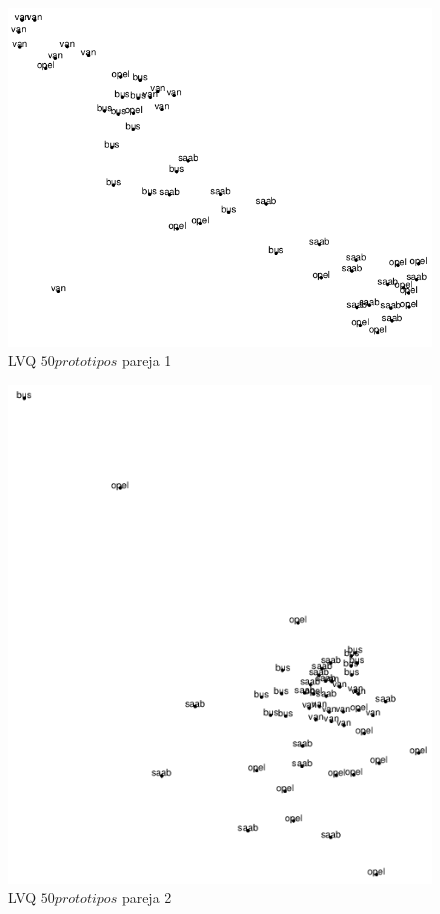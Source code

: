 \documentclass[11pt,spanish,listoffigures,listoftables]{workluis}
\begin{document}
\begin{figure}[H]
\centering
\includegraphics[scale=0.5]{lvq50p1}
\caption{LVQ $50 prototipos$ pareja 1}
\end{figure} 

\begin{figure}[H]
\centering
\includegraphics[scale=0.5]{lvq50p2}
\caption{LVQ $50 prototipos$ pareja 2}
\end{figure} 
\end{document}
